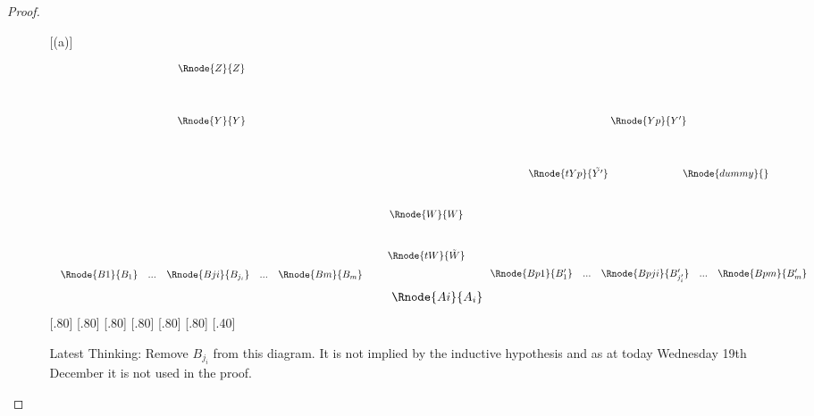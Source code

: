 \documentclass[10pt,a4paper]{scrartcl}
\begin{document}
\begin{proof}
\begin{enumerate}[(i)]
\begin{enumerate} [(a)]
\begin{minipage}{\textwidth}
\begin{center}
\begin{displaymath}
\begin{array}{c c c c c}
  \Rnode{Z}{Z} & &              &                               &              \\ [1.4cm]
  \Rnode{Y}{Y} & &              &                               &\Rnode{Yp}{Y'}\\ [1.4cm]
	&&&&\Rnode{tYp}{\pbase{Y'}}\hspace{2.6cm}\Rnode{dummy}{}\\ [1.0cm]
	             & & \Rnode{W}{W} &                               &              \\ [1.0cm]
               & & \Rnode{tW}{\pbase{W}} &                      &              \\ [0.2cm]
	 \begin{array}{cp{0.3cm}c         p{0.3cm}  c}					
   \Rnode{B1}{B_1}&  ... & \Rnode{Bji}{B_{j_i}} & ... & \Rnode{Bm}{B_m}
	 \end{array} 
	 & & & &
	\begin{array}{c c c c c}					
   \Rnode{Bp1}{B'_1}& ... & \Rnode{Bpji}{B'_{j'_i}}&  ... & \Rnode{Bpm}{B'_m}
	 \end{array}                                                
\end{array} 
\end{displaymath}
\vspace{1.0cm}
\begin{displaymath}
\begin{array}{c c c c c}
 & &               &  & \Rnode{Ai}{A_i}    \\
\end{array}
\end{displaymath}
[.80]
[.80]
[.80]
[.80]
[.80]
[.80]
[.40]
\end{center}
\end{minipage}
\noindent
Latest Thinking: Remove $B_{j_i}$ from this diagram. It is not implied by the inductive hypothesis and
as at today Wednesday 19th December it is not used in the proof. 


\end{enumerate}
\end{enumerate}
\end{proof}
\end{document}
